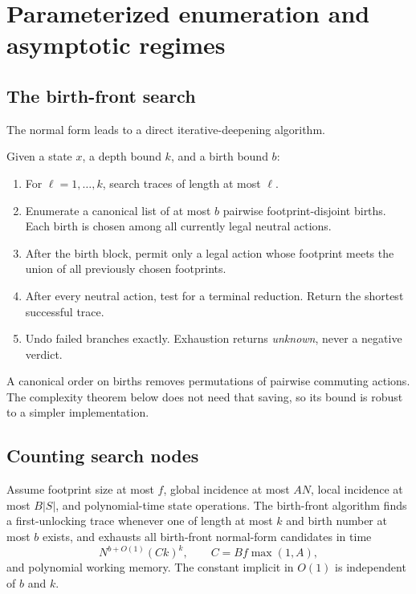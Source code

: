 \section{Parameterized enumeration and asymptotic regimes}
\label{sec:enumeration}

\subsection{The birth-front search}

The normal form leads to a direct iterative-deepening algorithm.

\begin{algorithmic}
\label{alg:birth-front}
Given a state $x$, a depth bound $k$, and a birth bound $b$:
\begin{enumerate}
\item For $\ell=1,\ldots,k$, search traces of length at most $\ell$.
\item Enumerate a canonical list of at most $b$ pairwise footprint-disjoint
      births.  Each birth is chosen among all currently legal neutral actions.
\item After the birth block, permit only a legal action whose footprint meets
      the union of all previously chosen footprints.
\item After every neutral action, test for a terminal reduction.  Return the
      shortest successful trace.
\item Undo failed branches exactly.  Exhaustion returns \emph{unknown}, never a
      negative verdict.
\end{enumerate}
\end{algorithmic}

A canonical order on births removes permutations of pairwise commuting actions.
The complexity theorem below does not need that saving, so its bound is robust
to a simpler implementation.

\subsection{Counting search nodes}

\begin{theorem}
\label{thm:enumeration}
Assume footprint size at most $f$, global incidence at most $AN$, local
incidence at most $B|S|$, and polynomial-time state operations.  The birth-front
algorithm finds a first-unlocking trace whenever one of length at most $k$ and
birth number at most $b$ exists, and exhausts all birth-front normal-form
candidates in time
\[
   N^{b+O(1)}(Ck)^k,
   \qquad C=Bf\max(1,A),
\]
and polynomial working memory.  The constant implicit in $O(1)$ is independent
of $b$ and $k$.
\end{theorem}

